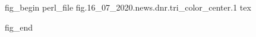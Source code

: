  
 
 
\ifcmt
fig_begin
	perl_file fig.16_07_2020.news.dnr.tri_color_center.1
	tex \caption{\sectitle}
fig_end
\fi

